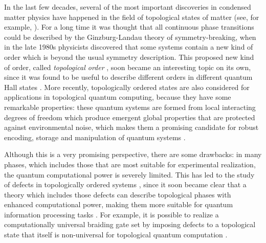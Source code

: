
In the last few decades, several of the most important discoveries in condensed matter physics have happened in the field of topological states of matter (see, for example, \cite{Wen07,NSSFD08,HK10,QZ11}). For a long time it was thought that all continuous phase transitions could be described by the Ginzburg-Landau theory of symmetry-breaking, when in the late 1980s physicists discovered that some systems contain a new kind of order which is beyond the usual symmetry description. This proposed new kind of order, called \emph{topological order} \cite{Wen90}, soon became an interesting topic on its own, since it was found to be useful to describe different orders in different quantum Hall states \cite{WN90}. More recently, topologically ordered states are also considered for applications in topological quantum computing, because they have some remarkable properties: these quantum systems are formed from local interacting degrees of freedom which produce emergent global properties that are protected against environmental noise, which makes them a promising candidate for robust encoding, storage and manipulation of quantum systems \cite{DKLP2002,Kit03,NSSFD08,Ter15,PY15,BLPSW16}.

Although this is a very promising perspective, there are some drawbacks: in many phases, which includes those that are most suitable for experimental realization, the quantum computational power is severely limited. This has led to the study of defects in topologically ordered systems \cite{RH07,Bombin2010,KK12,FSV13,BJQ13b,BASP14,JPSV15,DIP16,CCW16,BBD17,CCW17b,CCW17,BLKW17,KPEB18,ET19}, since it soon became clear that a theory which includes those defects can describe topological phases with enhanced computational power, making them more suitable for quantum information processing tasks \cite{Freedman1998,FLW02b,FLW02,FKLW02}. For example, it is possible to realize a computationally universal braiding gate set by imposing defects to a topological state that itself is non-universal for topological quantum computation \cite{BJQ13}. 

